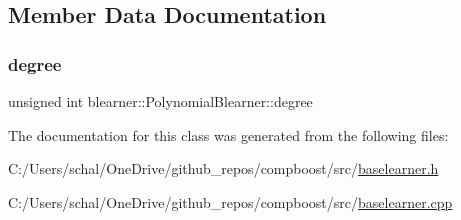 \subsection{Member Data Documentation}
\mbox{\label{classblearner_1_1_polynomial_blearner_a7a522e19634367a4bfad2d6ea532ec44}} 
\subsubsection{\texorpdfstring{degree}{degree}}
{\footnotesize\ttfamily unsigned int blearner\+::\+Polynomial\+Blearner\+::degree\hspace{0.3cm}{\ttfamily [private]}}



The documentation for this class was generated from the following files\+:\begin{DoxyCompactItemize}
\item 
C\+:/\+Users/schal/\+One\+Drive/github\+\_\+repos/compboost/src/\mbox{\hyperlink{baselearner_8h}{baselearner.\+h}}\item 
C\+:/\+Users/schal/\+One\+Drive/github\+\_\+repos/compboost/src/\mbox{\hyperlink{baselearner_8cpp}{baselearner.\+cpp}}\end{DoxyCompactItemize}
